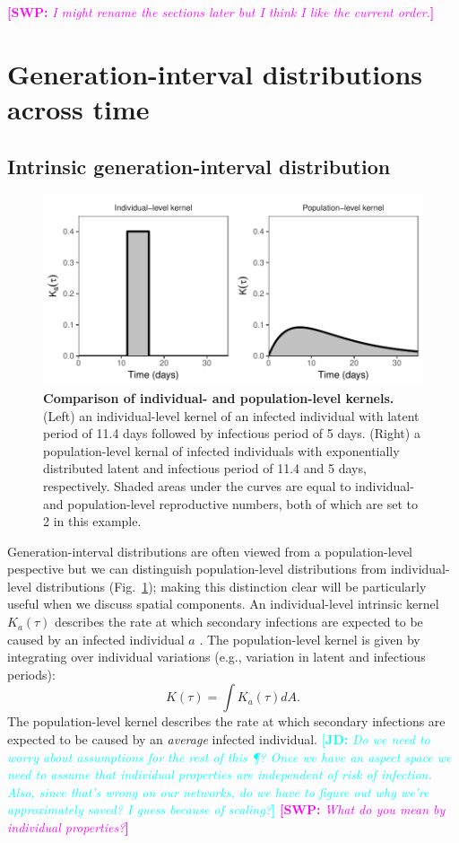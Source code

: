 \documentclass[12pt]{article}
\newcommand{\fref}[1]{Fig.~\ref{fig:#1}}
\newcommand{\comment}[3]{\textcolor{#1}{\textbf{[#2: }\textsl{#3}\textbf{]}}}
\newcommand{\jd}[1]{\comment{cyan}{JD}{#1}}
\newcommand{\swp}[1]{\comment{magenta}{SWP}{#1}}
\begin{document}
\swp{I might rename the sections later but I think I like the current order.}
\section{Generation-interval distributions across time}

\subsection{Intrinsic generation-interval distribution}

\begin{figure}[t]
\includegraphics[width=\textwidth]{../fig/individual_and_population.pdf}
\caption{\textbf{Comparison of individual- and population-level kernels.}
(Left) an individual-level kernel of an infected individual with latent period of 11.4 days followed by infectious period of 5 days. 
(Right) a population-level kernal of infected individuals with exponentially distributed latent and infectious period of 11.4 and 5 days, respectively. 
Shaded areas under the curves are equal to individual- and population-level reproductive numbers, both of which are set to 2 in this example.
}
\label{fig:indpop}

\end{figure}

Generation-interval distributions are often viewed from a population-level pespective but we can distinguish population-level distributions from individual-level distributions (\fref{indpop}); 
making this distinction clear will be particularly useful when we discuss spatial components.
An individual-level intrinsic kernel $K_a(\tau)$ describes the rate at which secondary infections are expected to be caused by an infected individual $a$ \citep{svensson2007note, svensson2015influence}.
The population-level kernel is given by integrating over individual variations (e.g., variation in latent and infectious periods):
\begin{equation}
K(\tau) = \int K_a (\tau) dA.
\end{equation}
The population-level kernel describes the rate at which secondary infections are expected to be caused by an \emph{average} infected individual.
\jd{Do we need to worry about assumptions for the rest of this \P? Once we have an aspect space we need to assume that individual properties are independent of risk of infection. Also, since that's wrong on our networks, do we have to figure out why we're approximately saved? I guess because of scaling?}
\swp{What do you mean by individual properties?}
\end{document}
